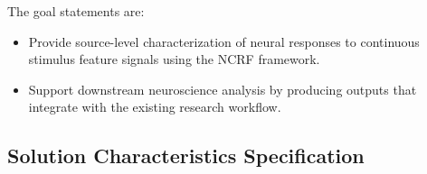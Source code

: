 \documentclass[12pt]{article}
\newcounter{goalnum} %
\begin{document}
\noindent The goal statements are:

\begin{itemize}


  \item[GS1:] Provide source-level characterization of neural responses to continuous stimulus feature signals using the NCRF framework.
  \item[GS2:] Support downstream neuroscience analysis by producing outputs that integrate with the existing research workflow.

\end{itemize}

\subsection{Solution Characteristics Specification}


\end{document}
